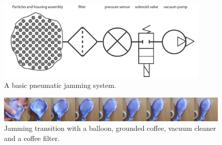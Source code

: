 \begin{figure}[hb]
	\centering
  		\includegraphics[width=4in]{figures/jamming/jamming-basics}
	\caption[A basic pneumatic jamming system.]
   {A basic pneumatic jamming system.}
   \label{fig:ch:jamming:jamming-basics}
\end{figure}

\begin{figure}[hb]
  \centering
      \includegraphics[width=\textwidth]{figures/jamming/jamming-transition}
  \caption[A jamming transition setup.]
   {Jamming transition with a balloon, grounded coffee, vacuum cleaner and a coffee filter.}
   \label{fig:ch:jamming:jamming-transition}
\end{figure}

